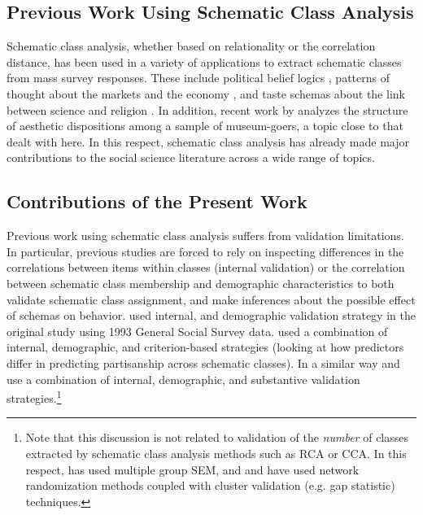 \documentclass[preprint, authoryear,11pt, 3p]{elsarticle}
\begin{document}
\subsection{Previous Work Using Schematic Class Analysis}
Schematic class analysis, whether based on relationality or the correlation distance, has been used in a variety of applications to extract schematic classes from mass survey responses. These include political belief logics \citep{baldassarri2014neither, daenekindt2017people}, patterns of thought about the markets and the economy \citep{dimaggio2018searching, metzmcDonnell2018multiple}, and taste schemas about the link between science and religion \citep{dimaggio2017culture}. In addition, recent work by \citet{daenekindt2017structure} analyzes the structure of aesthetic dispositions among a sample of museum-goers, a topic close to that dealt with here. In this respect, schematic class analysis has already made major contributions to the social science literature across a wide range of topics. 

\subsection{Contributions of the Present Work}
Previous work using schematic class analysis suffers from validation limitations. In particular, previous studies are forced to rely on inspecting differences in the correlations between items within classes (internal validation) or the correlation between schematic class membership and demographic characteristics to both validate schematic class assignment, and make inferences about the possible effect of schemas on behavior. \citet{goldberg2011mapping} used internal, and demographic validation strategy in the original study using 1993 General Social Survey data.\citet{baldassarri2014neither} used a combination of internal, demographic, and criterion-based strategies (looking at how predictors differ in predicting partisanship across schematic classes). In a similar way \citet{dimaggio2018searching} and \citet{dimaggio2017culture} use a combination of internal, demographic, and substantive validation strategies.\footnote{Note that this discussion is not related to validation of the \emph{number} of classes extracted by schematic class analysis methods such as RCA or CCA. In this respect, \citet{boutyline2017improving} has used multiple group SEM, and \citet{dimaggio2017culture} and \citet{dimaggio2018searching} have used network randomization methods coupled with cluster validation (e.g. gap statistic) techniques.}
\end{document}
